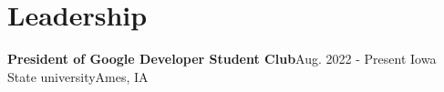 \section{Leadership}

    \resumeSubHeadingListStart
      \resumeSubheading
          {\textbf{President of Google Developer Student Club}}{Aug. 2022 - Present}
          {Iowa State university}{Ames, IA}
        \resumeItemListStart
        \resumeItemListEnd
    \resumeSubHeadingListEnd